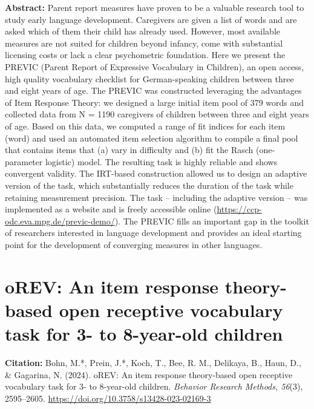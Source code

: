\documentclass[
]{scrbook}
\begin{document}
\textbf{Abstract:} Parent report measures have proven to be a valuable research tool to study early language development. Caregivers are given a list of words and are asked which of them their child has already used. However, most available measures are not suited for children beyond infancy, come with substantial licensing costs or lack a clear psychometric foundation. Here we present the PREVIC (Parent Report of Expressive Vocabulary in Children), an open access, high quality vocabulary checklist for German-speaking children between three and eight years of age. The PREVIC was constructed leveraging the advantages of Item Response Theory: we designed a large initial item pool of 379 words and collected data from N = 1190 caregivers of children between three and eight years of age. Based on this data, we computed a range of fit indices for each item (word) and used an automated item selection algorithm to compile a final pool that contains items that (a) vary in difficulty and (b) fit the Rasch (one-parameter logistic) model. The resulting task is highly reliable and shows convergent validity. The IRT-based construction allowed us to design an adaptive version of the task, which substantially reduces the duration of the task while retaining measurement precision. The task -- including the adaptive version -- was implemented as a website and is freely accessible online (\mbox{\url{https://ccp-odc.eva.mpg.de/previc-demo/}}). The PREVIC fills an important gap in the toolkit of researchers interested in language development and provides an ideal starting point for the development of converging measures in other languages.

\newpage

\section*{oREV: An item response theory-based open receptive vocabulary task for 3- to 8-year-old children}\label{orev}

\textbf{Citation:} Bohn, M.*, Prein, J.*, Koch, T., Bee, R. M., Delikaya, B., Haun, D., \& Gagarina, N. (2024). oREV: An item response theory-based open receptive vocabulary task for 3- to 8-year-old children. \emph{Behavior Research Methods, 56}(3), 2595--2605. \mbox{\url{https://doi.org/10.3758/s13428-023-02169-3}}
\end{document}
